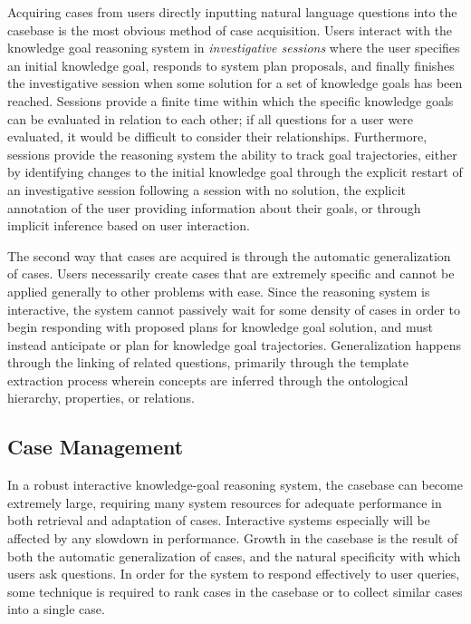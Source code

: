 \documentclass[11pt,letterpaper]{article}
\begin{document}
Acquiring cases from users directly inputting natural language questions into the casebase is the most obvious method of case acquisition. Users interact with the knowledge goal reasoning system in \textit{investigative sessions} where the user specifies an initial knowledge goal, responds to system plan proposals, and finally finishes the investigative session when some solution for a set of knowledge goals has been reached. Sessions provide a finite time within which the specific knowledge goals can be evaluated in relation to each other; if all questions for a user were evaluated, it would be difficult to consider their relationships. Furthermore, sessions provide the reasoning system the ability to track goal trajectories, either by identifying changes to the initial knowledge goal through the explicit restart of an investigative session following a session with no solution, the explicit annotation of the user providing information about their goals, or through implicit inference based on user interaction.

The second way that cases are acquired is through the automatic generalization of cases. Users necessarily create cases that are extremely specific and cannot be applied generally to other problems with ease. Since the reasoning system is interactive, the system cannot passively wait for some density of cases in order to begin responding with proposed plans for knowledge goal solution, and must instead anticipate or plan for knowledge goal trajectories. Generalization happens through the linking of related questions, primarily through the template extraction process wherein concepts are inferred through the ontological hierarchy, properties, or relations.

\subsection{Case Management}

In a robust interactive knowledge-goal reasoning system, the casebase can become extremely large, requiring many system resources for adequate performance in both retrieval and adaptation of cases. Interactive systems especially will be affected by any slowdown in performance. Growth in the casebase is the result of both the automatic generalization of cases, and the natural specificity with which users ask questions. In order for the system to respond effectively to user queries, some technique is required to rank cases in the casebase or to collect similar cases into a single case.
\end{document}
